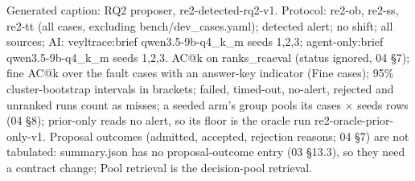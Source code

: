 \noindent Generated caption: RQ2 proposer, re2-detected-rq2-v1. Protocol: re2-ob, re2-ss, re2-tt (all cases, excluding bench/\allowbreak{}dev\_cases.yaml); detected alert; no shift; all sources; AI: veyltrace:brief qwen3.5-9b-q4\_k\_m seeds 1,2,3; agent-only:brief qwen3.5-9b-q4\_k\_m seeds 1,2,3. AC@k on ranks\_rcaeval (status ignored, 04 \S{}7); fine AC@k over the fault cases with an answer-key indicator (Fine cases); 95\% cluster-bootstrap intervals in brackets; failed, timed-out, no-alert, rejected and unranked runs count as misses; a seeded arm's group pools its cases $\times$ seeds rows (04 \S{}8); prior-only reads no alert, so its floor is the oracle run re2-oracle-prior-only-v1. Proposal outcomes (admitted, accepted, rejection reasons; 04 \S{}7) are not tabulated: summary.json has no proposal-outcome entry (03 \S{}13.3), so they need a contract change; Pool retrieval is the decision-pool retrieval.\par
\endgroup
